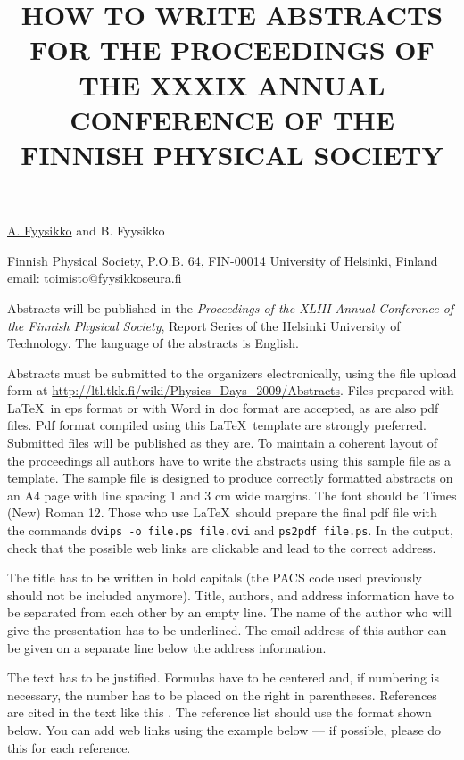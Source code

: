 \documentclass[12pt]{article}
\begin{document}
\title{HOW TO WRITE ABSTRACTS FOR THE PROCEEDINGS OF THE XXXIX ANNUAL CONFERENCE
OF THE FINNISH PHYSICAL SOCIETY}

\underline{A. Fyysikko} and B. Fyysikko

Finnish Physical Society, P.O.B. 64, FIN-00014 University of Helsinki, Finland\\
email: toimisto@fyysikkoseura.fi

\vspace{\baselineskip}


Abstracts will be published in the \emph{Proceedings of the XLIII
Annual Conference of the Finnish Physical Society}, Report Series of
the Helsinki University of Technology. The language of the abstracts
is English.

Abstracts must be submitted to the organizers electronically, using
the file upload form at
\url{http://ltl.tkk.fi/wiki/Physics_Days_2009/Abstracts}. Files
prepared with \LaTeX\ in eps format or with Word in doc format are
accepted, as are also pdf files. Pdf format compiled using this
\LaTeX\ template are strongly preferred. Submitted files will be
published as they are. To maintain a coherent layout of the
proceedings all authors have to write the abstracts using this
sample file as a template. The sample file is designed to produce
correctly formatted abstracts on an A4 page with line spacing 1 and
3 cm wide margins. The font should be Times (New) Roman 12. Those
who use \LaTeX\ should prepare the final pdf file with the commands
\mbox{\tt dvips -o file.ps file.dvi} and \mbox{\tt ps2pdf file.ps}.
In the output, check that the possible web links are clickable and
lead to the correct address.

The title has to be written in bold capitals (the PACS code used
previously should not be included anymore). Title, authors, and
address information have to be separated from each other by an empty
line. The name of the author who will give the presentation has to
be underlined. The email address of this author can be given on a
separate line below the address information.

The text has to be justified. Formulas have to be centered and, if
numbering is necessary, the number has to be placed on the right in
parentheses. References are cited in the text like this \cite{ref1}.
The reference list should use the format shown below. You can add
web links using the example below --- if possible, please do this
for each reference.
\end{document}
